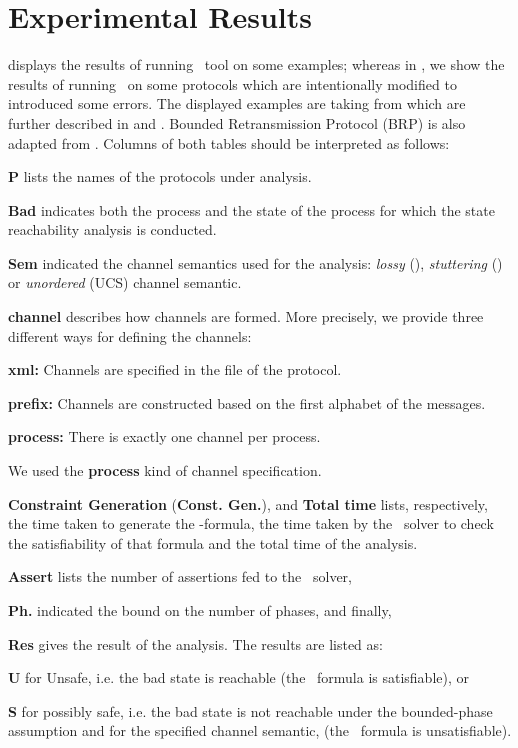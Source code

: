 \section{Experimental Results}

 displays the results of running \MPass\ tool on  some examples;
whereas in , we show the  results of running \MPass\ on some protocols which are intentionally modified to introduced some errors.
The displayed  examples are   taking  from \cite{JRSVgit}  which are further described in \cite{MPSV11} and \cite{RSV11}.
Bounded Retransmission Protocol (BRP) is also adapted from \cite{AABJ04}.
Columns of both tables should be interpreted as follows:

\begin{inparaenum}
\item {\bf P} lists the names of the protocols under analysis.
\item {\bf Bad} indicates both the process and the state of the process for which the state reachability analysis is conducted.
\item {\bf Sem} indicated the channel semantics used for the analysis: \textit{lossy} (\LCS), \textit{stuttering} (\SLCS) or \textit{unordered} (UCS) channel semantic.
\item {\bf channel} describes how channels are formed.  More precisely, we provide three different ways for defining the channels:
\begin{inparaenum}
\item {\bf xml:}  Channels are specified in the \xml file of the protocol.
\item {\bf prefix:} Channels are constructed based on the first alphabet of the messages.
\item {\bf process:} There is exactly one channel per process.
\end{inparaenum}
We used the \textbf{process} kind of channel specification.
\item {\bf Constraint Generation} (\textbf{Const. Gen.}), \textbf{\SMT} and {\bf Total time} lists, respectively, the time taken to generate  the \SMT-formula,
the time taken by the \SMT\ solver to check the satisfiability of that formula and the total time of the analysis.
\item {\bf Assert} lists the number of assertions fed to the \SMT\ solver,
\item {\bf Ph.} indicated the bound on the number of phases, and finally,
\item {\bf Res} gives the result of the analysis. The results are listed as:
\begin{inparaenum}
\item {\bf U} for Unsafe, i.e. the bad state is reachable (the \SMT\ formula is satisfiable), or
\item {\bf S} for possibly safe, i.e. the bad state is not reachable under the bounded-phase assumption and for the specified channel semantic,
(the \SMT\ formula is unsatisfiable).
\end{inparaenum}
\end{inparaenum}

